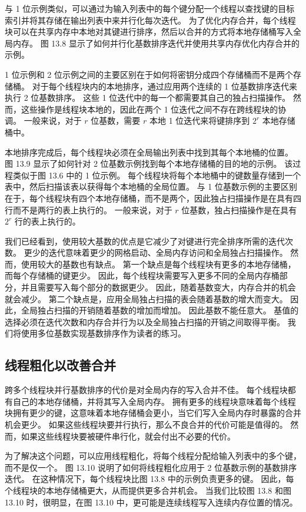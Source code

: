 与 1 位示例类似，可以通过为输入列表中的每个键分配一个线程以查找键的目标索引并将其存储在输出列表中来并行化每次迭代。 为了优化内存合并，每个线程块可以在共享内存中本地对其键进行排序，然后以合并的方式将本地存储桶写入全局内存。 图 13.8 显示了如何并行化基数排序迭代并使用共享内存优化内存合并的示例。

1 位示例和 2 位示例之间的主要区别在于如何将密钥分成四个存储桶而不是两个存储桶。 对于每个线程块内的本地排序，通过应用两个连续的 1 位基数排序迭代来执行 2 位基数排序。 这些 1 位迭代中的每一个都需要其自己的独占扫描操作。 然而，这些操作是线程块本地的，因此在两个 1 位迭代之间不存在跨线程块的协调。 一般来说，对于 $r$ 位基数，需要 $r$ 本地 1 位迭代来将键排序到 $2^{r}$ 本地存储桶中。

本地排序完成后，每个线程块必须在全局输出列表中找到其每个本地桶的位置。 图 13.9 显示了如何针对 2 位基数示例找到每个本地存储桶的目的地的示例。 该过程类似于图 13.6 中的 1 位示例。 每个线程块将每个本地桶中的键数量存储到一个表中，然后扫描该表以获得每个本地桶的全局位置。 与 1 位基数示例的主要区别在于，每个线程块有四个本地存储桶，而不是两个，因此独占扫描操作是在具有四行而不是两行的表上执行的。 一般来说，对于 $r$ 位基数，独占扫描操作是在具有 $2^{r}$ 行的表上执行的。

我们已经看到，使用较大基数的优点是它减少了对键进行完全排序所需的迭代次数。 更少的迭代意味着更少的网格启动、全局内存访问和全局独占扫描操作。 然而，使用较大的基数也有缺点。 第一个缺点是每个线程块有更多的本地存储桶，而每个存储桶的键更少。 因此，每个线程块需要写入更多不同的全局内存桶部分，并且需要写入每个部分的数据更少。 因此，随着基数变大，内存合并的机会就会减少。 第二个缺点是，应用全局独占扫描的表会随着基数的增大而变大。 因此，全局独占扫描的开销随着基数的增加而增加。 因此基数不能任意大。 基值的选择必须在迭代次数和内存合并行为以及全局独占扫描的开销之间取得平衡。 我们将使用多位基数实现基数排序作为读者的练习。

\subsection{线程粗化以改善合并}
跨多个线程块并行基数排序的代价是对全局内存的写入合并不佳。 每个线程块都有自己的本地存储桶，并将其写入全局内存。 拥有更多的线程块意味着每个线程块拥有更少的键，这意味着本地存储桶会更小，当它们写入全局内存时暴露的合并机会更少。 如果这些线程块要并行执行，那么不良合并的代价可能是值得的。 然而，如果这些线程块要被硬件串行化，就会付出不必要的代价。

为了解决这个问题，可以应用线程粗化，将每个线程分配给输入列表中的多个键，而不是仅一个。 图 13.10 说明了如何将线程粗化应用于 2 位基数示例的基数排序迭代。 在这种情况下，每个线程块比图 13.8 中的示例负责更多的键。 因此，每个线程块的本地存储桶更大，从而提供更多合并机会。 当我们比较图 13.8 和图 13.10 时，很明显，在图 13.10 中，更可能是连续线程写入连续内存位置的情况。

